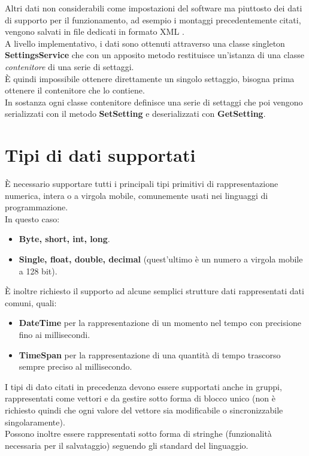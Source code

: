 \documentclass[\main/tesi.tex]{subfiles}
\begin{document}
Altri dati non considerabili come impostazioni del software ma piuttosto dei dati di supporto per il funzionamento, ad esempio i montaggi precedentemente citati, vengono salvati in file dedicati in formato XML \cite{xml}.\\
A livello implementativo, i dati sono ottenuti attraverso una classe singleton \textbf{SettingsService} che con un apposito metodo restituisce un'istanza di una classe \textit{contenitore} di una serie di settaggi.\\
È quindi impossibile ottenere direttamente un singolo settaggio, bisogna prima ottenere il contenitore che lo contiene.\\
In sostanza ogni classe contenitore definisce una serie di settaggi che poi vengono serializzati con il metodo \textbf{SetSetting} e deserializzati con \textbf{GetSetting}.

\section{Tipi di dati supportati}
È necessario supportare tutti i principali tipi primitivi di rappresentazione numerica, intera o a virgola mobile, comunemente usati nei linguaggi di programmazione.\\
In questo caso:
\begin{itemize}
    \item \textbf{Byte, short, int, long}.
    \item \textbf{Single, float, double, decimal} (quest'ultimo è un numero a virgola mobile a 128 bit).
\end{itemize}
È inoltre richiesto il supporto ad alcune semplici strutture dati rappresentati dati comuni, quali:
\begin{itemize}
    \item \textbf{DateTime} per la rappresentazione di un momento nel tempo con precisione fino ai millisecondi.
    \item \textbf{TimeSpan} per la rappresentazione di una quantità di tempo trascorso sempre preciso al millisecondo.
\end{itemize}
I tipi di dato citati in precedenza devono essere supportati anche in gruppi, rappresentati come vettori e da gestire sotto forma di blocco unico (non è richiesto quindi che ogni valore del vettore sia modificabile o sincronizzabile singolaramente).\\
Possono inoltre essere rappresentati sotto forma di stringhe (funzionalità necessaria per il salvataggio) seguendo gli standard del linguaggio.\\
\end{document}
